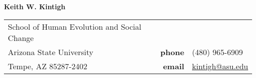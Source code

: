 %
%  
%

%
%
%

%
%    
%
\vspace{0.1in}

{\bf Keith W. Kintigh}
\begin{list1}
\item[]
\begin{tabular}{@{}p{2.75in}rl}

School of Human Evolution and Social Change   &  &  \\            
Arizona State University     & {\bf phone} & (480) 965-6909  \\         
Tempe, AZ 85287-2402         & {\bf email} & \href{mailto: kintigh@asu.edu}{kintigh@asu.edu}\\
  
\end{tabular}
\end{list1}

